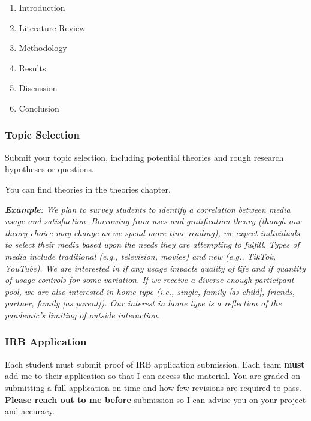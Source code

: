 \documentclass[
  b5paper]{book}
\begin{document}
\begin{enumerate}
\def\labelenumi{\arabic{enumi}.}
\item
  Introduction
\item
  Literature Review
\item
  Methodology
\item
  Results
\item
  Discussion
\item
  Conclusion
\end{enumerate}

\hypertarget{topic-selection}{%
\subsubsection*{Topic Selection}\label{topic-selection}}

Submit your topic selection, including potential theories and rough research hypotheses or questions.

You can find theories in the theories chapter.

\emph{\textbf{Example}: We plan to survey students to identify a correlation between media usage and satisfaction. Borrowing from uses and gratification theory (though our theory choice may change as we spend more time reading), we expect individuals to select their media based upon the needs they are attempting to fulfill. Types of media include traditional (e.g., television, movies) and new (e.g., TikTok, YouTube). We are interested in if any usage impacts quality of life and if quantity of usage controls for some variation. If we receive a diverse enough participant pool, we are also interested in home type (i.e., single, family {[}as child{]}, friends, partner, family {[}as parent{]}). Our interest in home type is a reflection of the pandemic's limiting of outside interaction.}

\hypertarget{irb-application}{%
\subsubsection*{IRB Application}\label{irb-application}}

Each student must submit proof of IRB application submission. Each team \textbf{must} add me to their application so that I can access the material. You are graded on submitting a full application on time and how few revisions are required to pass. \ul{\textbf{Please reach out to me before}} submission so I can advise you on your project and accuracy.
\end{document}
